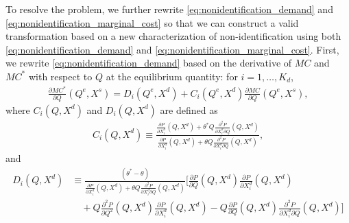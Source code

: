 \documentclass[11pt, a4paper]{article}
\theoremstyle{remark}
\begin{document}
To resolve the problem, we further rewrite \eqref{eq:nonidentification_demand} and \eqref{eq:nonidentification_marginal_cost} so that we can construct a valid transformation based on 
a new characterization of non-identification using both \eqref{eq:nonidentification_demand} and \eqref{eq:nonidentification_marginal_cost}.
First, we rewrite \eqref{eq:nonidentification_demand} based on the derivative of $MC$ and $MC^{*}$ with respect to $Q$ at the equilibrium quantity: for $i = 1, \ldots, K_d$,
\begin{align}
    \frac{\partial MC^{*}}{\partial Q}(Q^e, X^{s}) =D_i(Q^e, X^{d}) + C_i(Q^e, X^{d})\frac{\partial MC}{\partial Q}(Q^e, X^{s}),\label{eq:mc_transformation_quantity}
\end{align}
where $C_i(Q, X^{d})$ and $D_i(Q, X^{d})$ are defined as
\begin{align}
    C_i(Q, X^{d}) \equiv \frac{\frac{\partial P}{\partial X^{d}_i}(Q, X^{d}) + \theta^{*} Q\frac{\partial^2 P}{\partial X^{d}_{i}\partial Q}(Q, X^{d}) }{\frac{\partial P}{\partial X^{d}_i}(Q, X^{d}) + \theta Q\frac{\partial^2 P}{\partial X^{d}_{i}\partial Q}(Q, X^{d}) },\label{eq:ratio_marginal_revenue}
\end{align}
and
\begin{align}
    D_i(Q, X^{d}) & \equiv\frac{(\theta^{*} - \theta)}{\frac{\partial P}{\partial X^{d}_i}(Q, X^{d}) + \theta Q\frac{\partial^2 P}{\partial X^{d}_{i}\partial Q}(Q, X^{d})}\Bigg[\frac{\partial P}{\partial Q}(Q, X^{d}) \frac{\partial P}{\partial X^{d}_i}(Q, X^{d})\\
    &\quad + Q\frac{\partial^2 P}{\partial Q^2}(Q, X^{d}) \frac{\partial P}{\partial X^{d}_i}(Q, X^{d}) - Q \frac{\partial P}{\partial Q}(Q, X^{d}) \frac{\partial^2 P}{\partial X^{d}_i\partial Q}(Q, X^{d}) \Bigg]\label{eq:intercation_derivative_demand}
\end{align}
\end{document}
